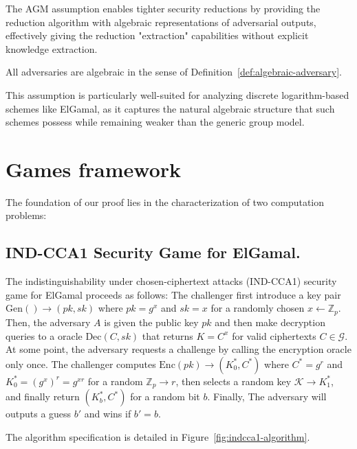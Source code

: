 The AGM assumption enables tighter security reductions by providing the reduction algorithm with algebraic representations of adversarial outputs, effectively giving the reduction "extraction" capabilities without explicit knowledge extraction.

\begin{assumption}
\label{ass:agm}
All adversaries are algebraic in the sense of Definition~\ref{def:algebraic-adversary}.
\end{assumption}

This assumption is particularly well-suited for analyzing discrete logarithm-based schemes like ElGamal, as it captures the natural algebraic structure that such schemes possess while remaining weaker than the generic group model.


\section{Games framework}

The foundation of our proof lies in the characterization of two computation problems:

\subsection{IND-CCA1 Security Game for ElGamal.} 

The indistinguishability under chosen-ciphertext attacks (IND-CCA1) security game for ElGamal \KEM proceeds as follows: The challenger first introduce a key pair $\text{Gen}()\rightarrow(pk,sk)$ where $pk = g^x$ and $sk = x$ for a randomly chosen $x \leftarrow \mathbb{Z}_p$. Then, the adversary $A$ is given the public key $pk$ and then make decryption queries to a oracle $\text{Dec}(C, sk)$ that returns $K = C^x$ for valid ciphertexts $C \in \mathcal{G}$. At some point, the adversary requests a challenge by calling the encryption oracle only once. The challenger computes $ \text{Enc}(pk)\rightarrow(K_0^*, C^*)$ where $C^* = g^r$ and $K_0^* = (g^x)^r = g^{xr}$ for a  random $ \mathbb{Z}_p \rightarrow r$, then selects a random key $ \mathcal{K} \rightarrow K_1^*$, and finally return $(K_b^*, C^*)$ for a random bit $b$. Finally, The adversary will outputs a guess $b'$ and wins if $b' = b$.

The algorithm specification\cite{fuchsbauer2018} is detailed in Figure~\ref{fig:indcca1-algorithm}.

